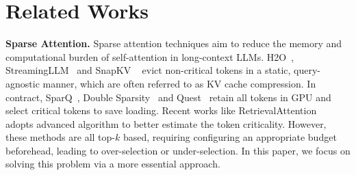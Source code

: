 \section{Related Works}


\textbf{Sparse Attention.} Sparse attention techniques aim to reduce the memory and computational burden of self-attention in long-context LLMs. H2O~\cite{zhang2023h2o}, StreamingLLM~\cite{xiao2023streamingllm} and SnapKV ~\cite{li2024snapkv} evict non-critical tokens in a static, query- agnostic manner, which are often referred to as KV cache compression. In contract, SparQ~\cite{ribar2023sparq}, Double Sparsity~\cite{yang2024post} and Quest~\cite{tang2024quest} retain all tokens in GPU and select critical tokens to save loading. Recent works like RetrievalAttention~\cite{liu2024retrievalattention} adopts advanced algorithm to better estimate the token criticality. However, these methods are all top-$k$ based, requiring configuring an appropriate budget beforehead, leading to over-selection or under-selection. In this paper, we focus on solving this problem via a  more essential approach.


